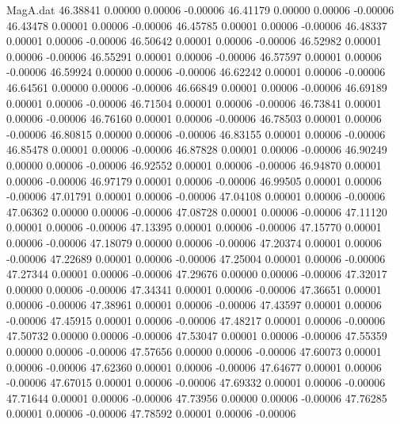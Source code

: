 \begin{filecontents}{MagA.dat}
  46.38841    0.00000    0.00006   -0.00006
  46.41179    0.00000    0.00006   -0.00006
  46.43478    0.00001    0.00006   -0.00006
  46.45785    0.00001    0.00006   -0.00006
  46.48337    0.00001    0.00006   -0.00006
  46.50642    0.00001    0.00006   -0.00006
  46.52982    0.00001    0.00006   -0.00006
  46.55291    0.00001    0.00006   -0.00006
  46.57597    0.00001    0.00006   -0.00006
  46.59924    0.00000    0.00006   -0.00006
  46.62242    0.00001    0.00006   -0.00006
  46.64561    0.00000    0.00006   -0.00006
  46.66849    0.00001    0.00006   -0.00006
  46.69189    0.00001    0.00006   -0.00006
  46.71504    0.00001    0.00006   -0.00006
  46.73841    0.00001    0.00006   -0.00006
  46.76160    0.00001    0.00006   -0.00006
  46.78503    0.00001    0.00006   -0.00006
  46.80815    0.00000    0.00006   -0.00006
  46.83155    0.00001    0.00006   -0.00006
  46.85478    0.00001    0.00006   -0.00006
  46.87828    0.00001    0.00006   -0.00006
  46.90249    0.00000    0.00006   -0.00006
  46.92552    0.00001    0.00006   -0.00006
  46.94870    0.00001    0.00006   -0.00006
  46.97179    0.00001    0.00006   -0.00006
  46.99505    0.00001    0.00006   -0.00006
  47.01791    0.00001    0.00006   -0.00006
  47.04108    0.00001    0.00006   -0.00006
  47.06362    0.00000    0.00006   -0.00006
  47.08728    0.00001    0.00006   -0.00006
  47.11120    0.00001    0.00006   -0.00006
  47.13395    0.00001    0.00006   -0.00006
  47.15770    0.00001    0.00006   -0.00006
  47.18079    0.00000    0.00006   -0.00006
  47.20374    0.00001    0.00006   -0.00006
  47.22689    0.00001    0.00006   -0.00006
  47.25004    0.00001    0.00006   -0.00006
  47.27344    0.00001    0.00006   -0.00006
  47.29676    0.00000    0.00006   -0.00006
  47.32017    0.00000    0.00006   -0.00006
  47.34341    0.00001    0.00006   -0.00006
  47.36651    0.00001    0.00006   -0.00006
  47.38961    0.00001    0.00006   -0.00006
  47.43597    0.00001    0.00006   -0.00006
  47.45915    0.00001    0.00006   -0.00006
  47.48217    0.00001    0.00006   -0.00006
  47.50732    0.00000    0.00006   -0.00006
  47.53047    0.00001    0.00006   -0.00006
  47.55359    0.00000    0.00006   -0.00006
  47.57656    0.00000    0.00006   -0.00006
  47.60073    0.00001    0.00006   -0.00006
  47.62360    0.00001    0.00006   -0.00006
  47.64677    0.00001    0.00006   -0.00006
  47.67015    0.00001    0.00006   -0.00006
  47.69332    0.00001    0.00006   -0.00006
  47.71644    0.00001    0.00006   -0.00006
  47.73956    0.00000    0.00006   -0.00006
  47.76285    0.00001    0.00006   -0.00006
  47.78592    0.00001    0.00006   -0.00006

\end{filecontents}
